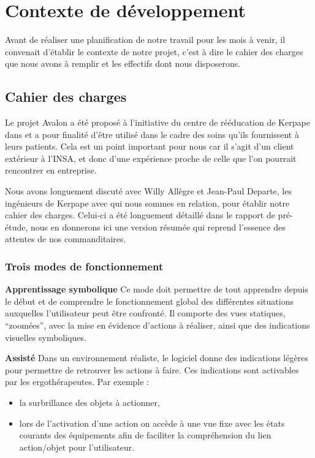 \section{Contexte de développement}

Avant de réaliser une planification de notre travail pour les mois à venir, il convenait d'établir le contexte de notre projet, c'est à dire le cahier des charges que nous avons à remplir et  les effectifs dont nous disposerons.

\subsection{Cahier des charges}

Le projet Avalon a été proposé à l'initiative du centre de rééducation de Kerpape dans et a pour finalité d'être utilisé dans le cadre des soins qu'ils fournissent à leurs patients. Cela est un point important pour nous car il s'agit d'un client extérieur à l'INSA, et donc d'une expérience proche de celle que l'on pourrait rencontrer en entreprise. \newline

Nous avons longuement discuté avec Willy Allègre et Jean-Paul Departe, les ingénieurs de Kerpape avec qui nous sommes en relation, pour établir notre cahier des charges. Celui-ci a été longuement détaillé dans le rapport de pré-étude, nous en donnerons ici une version résumée qui reprend l'essence des attentes de nos commanditaires. 

\subsubsection{Trois modes de fonctionnement}

\textbf{Apprentissage symbolique}
\newline
Ce mode doit permettre de tout apprendre depuis le début et de comprendre le fonctionnement global des différentes situations auxquelles l'utilisateur peut être confronté. Il comporte des vues statiques, \enquote{zoomées}, avec la mise en évidence d'actions à réaliser, ainsi que des indications visuelles symboliques.\newline

\textbf{Assisté}
\newline
Dans un environnement réaliste, le logiciel donne des indications légères pour permettre de retrouver les actions à faire. Ces indications sont activables par les ergothérapeutes. Par exemple :
\begin{itemize}
  \item la surbrillance des objets à actionner,
  \item lors de l'activation d'une action on accède à une vue fixe avec les états courants des équipements afin de faciliter la compréhension du lien action/objet pour l'utilisateur. \newline
\end{itemize}

